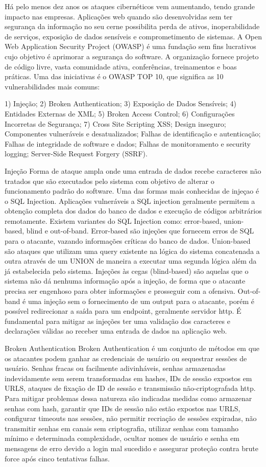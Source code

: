 Há pelo menos dez anos os ataques cibernéticos vem aumentando, tendo grande impacto nas empresas.
Aplicações web quando são desenvolvidas sem ter segurança da informação no seu cerne possibilita perda de ativos, inoperabilidade de serviços, exposição de dados sensíveis e comprometimento de sistemas. 
A Open Web Application Security Project (OWASP) é uma fundação sem fins lucrativos cujo objetivo é aprimorar a segurança do software. A organização fornece projeto de código livre, vasta comunidade ativa, conferências, treinamentos e boas práticas. Uma das iniciativas é o OWASP TOP 10, que significa as 10 vulnerabilidades mais comuns:

1) Injeção;
2) Broken Authentication;
3) Exposição de Dados Sensíveis;
4) Entidades Externas de XML;
5) Broken Access Control;
6) Configurações Incorretas de Segurança;
7) Cross Site Scripting XSS;
Design inseguro;
Componentes vulneráveis e desatualizados;
Falhas de identificação e autenticação;
Falhas de integridade de software e dados;
Falhas de monitoramento e security logging;
Server-Side Request Forgery (SSRF).

Injeção
Forma de ataque ampla onde uma entrada de dados recebe caracteres não tratados que são executados pelo sistema com objetivo de alterar o funcionamento padrão do software.
Uma das formas mais conhecidas de injeçao é o SQL Injection. Aplicações vulneráveis a SQL injection geralmente permitem a obtenção completa dos dados do banco de dados e execução de códigos arbitrários remotamente. Existem variantes do SQL Injection como: error-based, union-based, blind e out-of-band. Error-based são injeções que fornecem erros de SQL para o atacante, vazando informações críticas do banco de dados. Union-based são ataques que utilizam uma query existente na lógica do sistema concatenada a outra através de um UNION de maneira a executar uma segunda lógica além da já estabelecida pelo sistema. Injeções às cegas (blind-based) são aquelas que o sistema não dá nenhuma informação após a injeção, de forma que o atacante precisa ser engenhoso para obter informações e prosseguir com a ofensiva. Out-of-band é uma injeção sem o fornecimento de um output para o atacante, porém é possível redirecionar a saída para um endpoint, geralmente servidor http.
É fundamental para mitigar as injeções ter uma validação dos caracteres e declarações válidas ao receber uma entrada de dados na aplicação web.

Broken Authentication
Broken Authentication é um conjunto de métodos em que os atacantes podem ganhar as credenciais de usuário ou sequestrar sessões de usuário. Senhas fracas ou facilmente adivinháveis, senhas armazenadas indevidamente sem serem transformadas em hashes, IDs de sessão expostos em URLS, ataques de fixação de ID de sessão e transmissão não-criptografada http.
Para mitigar problemas dessa natureza são indicadas medidas como armazenar senhas com hash, garantir que IDs de sessão não estão expostos nas URLS, configurar timeouts nas sessões, não permitir recriação de sessões expiradas, não transmitir senhas em canais sem criptografia, utilizar senhas com tamanho mínimo e determinada complexidade, ocultar nomes de usuário e senha em mensagens de erro devido a login mal sucedido e assegurar proteção contra brute force após cinco tentativas falhas.

